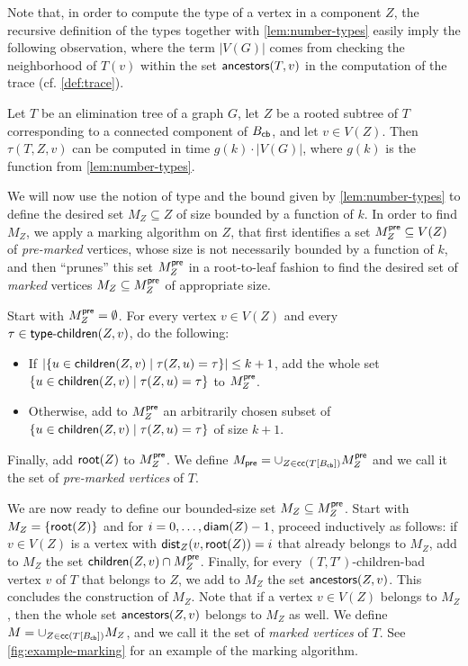 \documentclass[a4paper,UKenglish,cleveref, autoref, thm-restate]{lipics-v2021}
\newcommand{\child}{{\sf children}\xspace}
\renewcommand{\root}{{\sf root}\xspace}
\newcommand{\anc}{{\sf ancestors}\xspace}
\newcommand{\dist}{{\sf dist}\xspace}
\newcommand{\diam}{{\sf diam}\xspace}
\newcommand{\Bcb}{B_{\sf cb}\xspace}
\newcommand{\typechild}{{\sf type\text{-}children}\xspace}
\begin{document}
Note that, in order to compute the type of a vertex in a component $Z$, the recursive definition of the types together with \autoref{lem:number-types} easily imply the following observation, where the term $|V(G)|$ comes from checking the neighborhood of $T(v)$ within the set $\anc(T,v)$ in the computation of the trace (cf. \autoref{def:trace}).

\begin{observation}\label{obs:computation-types}
Let $T$ be an elimination tree of a graph $G$, let $Z$ be a rooted subtree of $T$ corresponding to a connected component of $\Bcb$, and let $v \in V(Z)$. Then  $\tau(T,Z,v)$ can be computed in time $g(k) \cdot |V(G)|$, where $g(k)$ is the function from \autoref{lem:number-types}.
\end{observation}

We will now use the notion of type and the bound given by \autoref{lem:number-types} to define the desired set
$M_Z \subseteq Z$ of size bounded by a function of $k$.
In order to find $M_Z$, we apply a  marking algorithm on $Z$, that first identifies a set $M_Z^{\sf pre} \subseteq V(Z)$ of \textit{pre-marked} vertices, whose size is not necessarily bounded by a function of $k$, and then ``prunes'' this set $M_Z^{\sf pre}$ in a root-to-leaf fashion to find the desired  set of \textit{marked} vertices $M_Z \subseteq M_Z^{\sf pre}$ of appropriate size.





Start with $M_Z^{\sf pre}= \emptyset$. For every vertex $v \in V(Z)$ and every $\tau \in \typechild(Z,v)$, do the following:
\begin{itemize}
  \item If $|\{u \in \child(Z,v) \mid \tau(Z,u) = \tau\}| \leq k +1$, add the whole set $\{u \in \child(Z,v) \mid \tau(Z,u) = \tau\}$ to $M_Z^{\sf pre}$.
  \item Otherwise, add to $M_Z^{\sf pre}$ an arbitrarily chosen subset of $\{u \in \child(Z,v) \mid \tau(Z,u) = \tau\}$ of size $k+1$.
\end{itemize}

Finally, add $\root(Z)$ to $M_Z^{\sf pre}$. We define $M_{\sf pre} = \cup_{Z \in {\sf cc}(T[\Bcb])}M_Z^{\sf pre}$ and we call it the set of \emph{pre-marked vertices} of $T$.

We are now ready to define our bounded-size set $M_Z \subseteq M_Z^{\sf pre}$. Start with $M_Z=\{\root(Z)\}$ and for $i = 0,\ldots, \diam(Z)-1$, proceed inductively as follows: if $v \in V(Z)$ is a vertex with $\dist_Z(v,\root(Z))=i$ that already belongs to $M_Z$, add to $M_Z$ the set $\child(Z,v) \cap M_Z^{\sf pre}$. Finally, for every $(T,T')$-children-bad vertex $v$ of $T$ that belongs to $Z$, we add to $M_Z$ the set $\anc(Z,v)$. This concludes the construction of $M_Z$. Note that if a vertex $v \in V(Z)$ belongs to $M_Z$, then the whole set $\anc(Z,v)$ belongs to $M_Z$ as well. We define $M = \cup_{Z \in {\sf cc}(T[\Bcb])}M_Z$, and we call it the set of \emph{marked vertices} of $T$. See \autoref{fig:example-marking} for an example of the marking algorithm.
\end{document}
